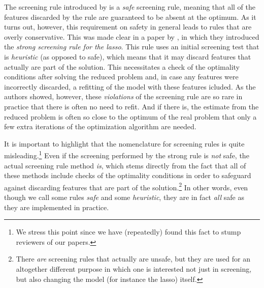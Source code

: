 The screening rule introduced by \textcite{elghaoui2010} is a \emph{safe} screening rule, meaning that all of the features discarded by the rule are guaranteed to be absent at the optimum. As it turns out, however, this requirement on safety in general leads to rules that are overly conservative. This was made clear in a paper by \textcite{tibshirani2012}, in which they introduced the \emph{strong screening rule for the lasso}. This rule uses an initial screening test that is \emph{heuristic} (as opposed to safe), which means that it may discard features that actually are part of the solution. This necessitates a check of the optimality conditions after solving the reduced problem and, in case any features were incorrectly discarded, a refitting of the model with these features icluded. As the authors showed, however, these \emph{violations} of the screening rule are so rare in practice that there is often no need to refit. And if there is, the estimate from the reduced problem is often so close to the optimum of the real problem that only a few extra iterations of the optimization algorithm are needed.

It is important to highlight that the nomenclature for screening rules is quite misleading.\footnote{We stress this point since we have (repeatedly) found this fact to stump reviewers of our papers.} Even if the screening performed by the strong rule is \emph{not} safe, the actual screening rule method \emph{is}, which stems directly from the fact that all of these methods include checks of the optimality conditions in order to safeguard against discarding features that are part of the solution.\footnote{There \emph{are} screening rules that actually are unsafe, but they are used for an altogether different purpose in which one is interested not just in screening, but also changing the model (for instance the lasso) itself.} In other words, even though we call some rules \emph{safe} and some \emph{heuristic}, they are in fact \emph{all} safe as they are implemented in practice.

